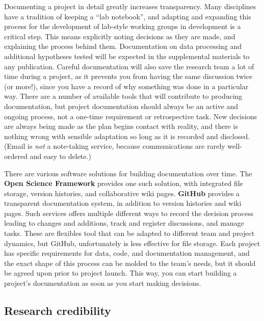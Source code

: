 Documenting a project in detail greatly increases transparency.
Many disciplines have a tradition of keeping a ``lab notebook'',
and adapting and expanding this process for the development
of lab-style working groups in development is a critical step.
This means explicitly noting decisions as they are made, and explaining the process behind them.
Documentation on data processing and additional hypotheses tested
will be expected in the supplemental materials to any publication.
Careful documentation will also save the research team a lot of time during a project,
as it prevents you from having the same discussion twice (or more!),
since you have a record of why something was done in a particular way.
There are a number of available tools
that will contribute to producing documentation,
but project documentation should always be an active and ongoing process,
not a one-time requirement or retrospective task.
New decisions are always being made as the plan begins contact with reality,
and there is nothing wrong with sensible adaptation so long as it is recorded and disclosed.
(Email is \textit{not} a note-taking service, because communications are rarely well-ordered and easy to delete.)

There are various software solutions for building documentation over time.
The \textbf{Open Science Framework} provides one such solution,
with integrated file storage, version histories, and collaborative wiki pages.
\textbf{GitHub} provides a transparent documentation system,
in addition to version histories and wiki pages.
Such services offers multiple different ways to record the decision process leading to changes and additions,
track and register discussions, and manage tasks.
These are flexibles tool that can be adapted to different team and project dynamics,
but GitHub, unfortunately is less effective for file storage.
Each project has specific requirements for data, code, and documentation management,
and the exact shape of this process can be molded to the team's needs,
but it should be agreed upon prior to project launch.
This way, you can start building a project's documentation as soon as you start making decisions.

\subsection{Research credibility}


